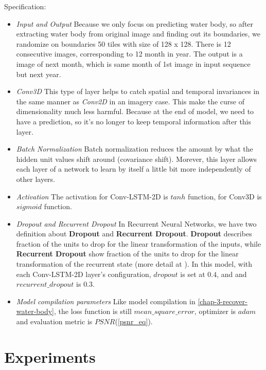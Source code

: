 Specification:

\begin{itemize}
	\item \textit{Input and Output} Because we only focus on predicting water body, so after extracting water body from original image and finding out its boundaries, we randomize on boundaries 50 tiles with size of 128 x 128. There is 12 consecutive images, corresponding to 12 month in year. The output is a image of next month, which is same month of 1st image in input sequence but next year. 
	
	\item \textit{Conv3D} This type of layer helps to catch spatial and temporal invariances in the same manner as \textit{Conv2D} in an imagery case. This make the curse of dimensionality much less harmful. Because at the end of model, we need to have a prediction, so it's no longer to keep temporal information after this layer.
	
	\item \textit{Batch Normalization} Batch normalization reduces the amount by what the hidden unit values shift around (covariance shift). Morever, this layer allows each layer of a network to learn by itself a little bit more independently of other layers.
	
	\item \textit{Activation} The activation for Conv-LSTM-2D is $tanh$ function, for Conv3D is $sigmoid$ function.
	
	\item \textit{Dropout and Recurrent Dropout} In Recurrent Neural Networks, we have two definition about \textbf{Dropout} and \textbf{Recurrent Dropout}. \textbf{Dropout} describes fraction of the units to drop for the linear transformation of the inputs, while \textbf{Recurrent Dropout} show fraction of the units to drop for the linear transformation of the recurrent state (more detail at \cite{Gal2015}). In this model, with each Conv-LSTM-2D layer's configuration, $dropout$ is set at $0.4$, and and $recurrent\_dropout$ is $0.3$.
	
	\item \textit{Model compilation parameters} Like model compilation in \ref{chap-3-recover-water-body}, the loss function is still $mean\_square\_error$, optimizer is $adam$ and evaluation metric is $PSNR$(\ref{psnr_eq}). 
	
\end{itemize}

\section{Experiments}

